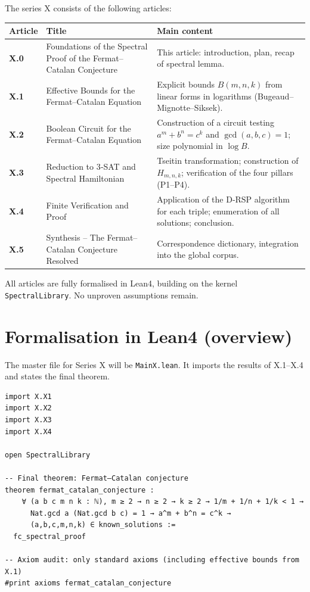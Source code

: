 \documentclass[11pt,a4paper]{article}
\begin{document}
The series X consists of the following articles:

\begin{center}
\small
\begin{tabular}{@{}>{\bfseries}l>{\raggedright\arraybackslash}p{4.5cm}>{\raggedright\arraybackslash}p{6cm}@{}}
\toprule
\textbf{Article} & \textbf{Title} & \textbf{Main content} \\
\midrule
X.0 & Foundations of the Spectral Proof of the Fermat–Catalan Conjecture & This article: introduction, plan, recap of spectral lemma. \\
X.1 & Effective Bounds for the Fermat–Catalan Equation & Explicit bounds \(B(m,n,k)\) from linear forms in logarithms (Bugeaud–Mignotte–Siksek). \\
X.2 & Boolean Circuit for the Fermat–Catalan Equation & Construction of a circuit testing \(a^m+b^n=c^k\) and \(\gcd(a,b,c)=1\); size polynomial in \(\log B\). \\
X.3 & Reduction to 3‑SAT and Spectral Hamiltonian & Tseitin transformation; construction of \(H_{m,n,k}\); verification of the four pillars (P1–P4). \\
X.4 & Finite Verification and Proof & Application of the D‑RSP algorithm for each triple; enumeration of all solutions; conclusion. \\
X.5 & Synthesis – The Fermat–Catalan Conjecture Resolved & Correspondence dictionary, integration into the global corpus. \\
\bottomrule
\end{tabular}
\normalsize
\end{center}

All articles are fully formalised in Lean4, building on the kernel \texttt{SpectralLibrary}. No unproven assumptions remain.

\section{Formalisation in Lean4 (overview)}

The master file for Series X will be \texttt{MainX.lean}. It imports the results of X.1–X.4 and states the final theorem.

\begin{lstlisting}[style=lean, caption={MainX.lean (final)}]
import X.X1
import X.X2
import X.X3
import X.X4

open SpectralLibrary

-- Final theorem: Fermat–Catalan conjecture
theorem fermat_catalan_conjecture :
    ∀ (a b c m n k : ℕ), m ≥ 2 → n ≥ 2 → k ≥ 2 → 1/m + 1/n + 1/k < 1 →
      Nat.gcd a (Nat.gcd b c) = 1 → a^m + b^n = c^k →
      (a,b,c,m,n,k) ∈ known_solutions :=
  fc_spectral_proof

-- Axiom audit: only standard axioms (including effective bounds from X.1)
#print axioms fermat_catalan_conjecture
\end{lstlisting}
\end{document}
